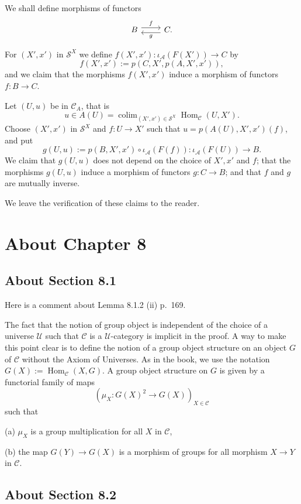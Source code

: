 \documentclass[12pt]{article}
\theoremstyle{remark}
\theoremstyle{definition}
\newcommand{\nn}{\noindent}
\newcommand{\A}{\mathcal A}
\newcommand{\C}{\mathcal C}
\newcommand{\SSS}{\mathcal S}
\newcommand{\U}{\mathcal U}
\DeclareMathOperator*{\colim}{colim}
\DeclareMathOperator{\Hom}{Hom}
\begin{document}
We shall define morphisms of functors 
$$
\begin{tikzcd}
B\ar[yshift=.7ex]{r}{f}&C\ar[yshift=-.7ex]{l}{g}.
\end{tikzcd}
$$

For $(X',x')$ in $\SSS^X$ we define $f(X',x'):\iota_\A(F(X'))\to C$ by 
$$
f(X',x'):=p(C,X',p(A,X',x')),
$$ 
and we claim that the morphisms $f(X',x')$ induce a morphism of functors $f:B\to C$. 

Let $(U,u)$ be in $\C_A$, that is
$$
u\in A(U)=\colim_{(X',x')\in\SSS^X}\Hom_\C(U,X').
$$ 
Choose $(X',x')$ in $\SSS^X$ and $f:U\to X'$ such that $u=p(A(U),X',x')(f)$, and put 
$$
g(U,u):=p(B,X',x')\circ\iota_\A(F(f)):\iota_\A(F(U))\to B.
$$ 
We claim that $g(U,u)$ does not depend on the choice of $X',x'$ and $f$; that the morphisms $g(U,u)$ induce a morphism of functors $g:C\to B$; and that $f$ and $g$ are mutually inverse. 

We leave the verification of these claims to the reader. 


\section{About Chapter 8} 

\subsection{About Section 8.1}

Here is a comment about Lemma 8.1.2 (ii) p.~169. 

The fact that the notion of group object is independent of the choice of a universe $\U$ such that $\C$ is a $\U$-category is implicit in the proof. A way to make this point clear is to define the notion of a group object structure on an object $G$ of $\C$ without the Axiom of Universes. As in the book, we use the notation $G(X):=\Hom_\C(X,G)$. A group object structure on $G$ is given by a functorial family of maps 
$$
(\mu_X:G(X)^2\to G(X))_{X\in\C}
$$ 
such that 

\nn(a) $\mu_X$ is a group multiplication for all $X$ in $\C$, 

\nn(b) the map $G(Y)\to G(X)$ is a morphism of groups for all morphism $X\to Y$ in $\C$. 


\subsection{About Section 8.2}
\end{document}
